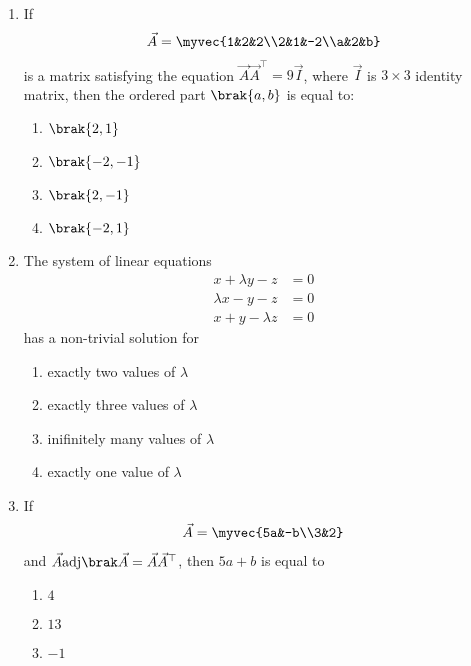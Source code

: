 \begin{enumerate}
	\item If \begin{align*} \vec{A} = \myvec{1&2&2\\2&1&-2\\a&2&b} \end{align*} is a matrix satisfying the equation $\vec{A}\vec{A}^{\top} = 9\vec{I}$, where $\vec{I}$ is $3\times3$ identity matrix, then the ordered part $\brak{a,b}$ is equal to:
	\hfill {}{\par}
\begin{multicols}{4}
	\begin{enumerate}
	    	\item $\brak{2,1}$ 
	    	\item $\brak{-2,-1}$ 
	    	\item $\brak{2,-1}$ 
	   	\item $\brak{-2,1}$ 
	\end{enumerate}
\end{multicols}
	\item The system of linear equations 
	\begin{align*}
		x+\lambda y-z &= 0\\
		\lambda x-y-z &= 0\\
		x+y-\lambda z &= 0
	\end{align*}
	has a non-trivial solution for
	\hfill{}
\begin{multicols}{2}
	\begin{enumerate}
		\item exactly two values of $\lambda$ 
		\item exactly three values of $\lambda$ 
		\item inifinitely many values of $\lambda$
		\item exactly one value of $\lambda$ 
	\end{enumerate}
\end{multicols}
\item If \begin{align*} \vec{A} = \myvec{5a&-b\\3&2}\end{align*} and $\vec{A} \adj{\vec{A}} = \vec{A}\vec{A}^{\top}$, then $5a + b$ is equal to
	\hfill{}
\begin{multicols}{4}
	\begin{enumerate}
	    	\item $4$ 
	    	\item $13$
	    	\item $-1$

\end{enumerate}
\end{multicols}
\end{enumerate}
